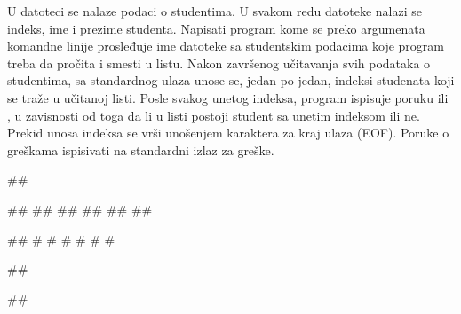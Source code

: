\begin{Exercise}[label=604]
U datoteci se nalaze podaci o studentima. U svakom redu datoteke nalazi se indeks, ime i prezime studenta. 
Napisati program kome se preko argumenata komandne linije prosleđuje ime datoteke sa studentskim podacima koje program treba da pročita i smesti u listu. 
Nakon završenog učitavanja svih podataka o studentima, sa standardnog ulaza unose se, jedan po jedan, indeksi studenata koji se traže u učitanoj listi. 
Posle svakog unetog indeksa, program ispisuje poruku  ili , u zavisnosti od toga da li u listi postoji student sa unetim indeksom ili ne. 
Prekid unosa indeksa se vrši unošenjem karaktera za kraj ulaza (EOF). Poruke o greškama ispisivati na standardni izlaz za greške.



\begin{miditest}
\begin{upotreba}{1}
##

##
##
##
##
##
##

#\naslovInt#           
# #
# #
# #
\end{upotreba}
\end{miditest}
\begin{miditest}
\begin{upotreba}{2}
##

##


\end{upotreba}
\end{miditest}
\end{Exercise}
